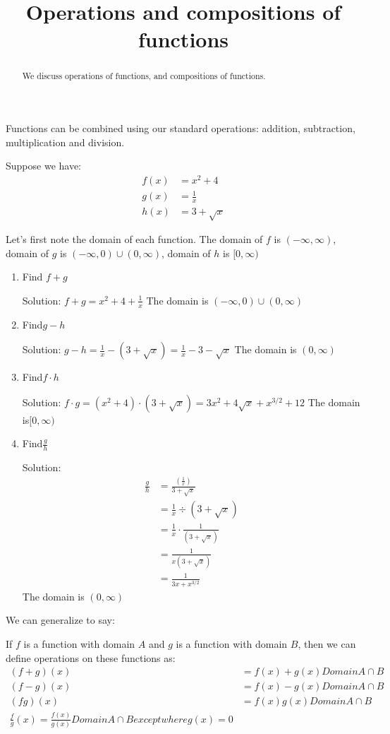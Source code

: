 \documentclass{ximera}
\title{Operations and compositions of functions}
\begin{document}
\begin{abstract}
  We discuss operations of functions, and compositions of functions.
\end{abstract}
\maketitle


Functions can be combined using our standard operations: addition, subtraction, multiplication and division.

\begin{example}
Suppose we have: 
\begin{align}
  f(x) &={{x}^{2}}+4 \\ 
  g(x) &=\frac{1}{x} \\ 
  h(x) &=3+\sqrt{x}  
\end{align}

Let's first note the domain of each function.  The domain of $f$ is
$(-\infty ,\infty )$, domain of $g$ is $(-\infty ,0)\cup (0,\infty )$,
domain of $h$ is $[0,\infty)$
\begin{enumerate}
\item Find $f+g$
  
  Solution: $f+g={{x}^{2}}+4+\frac{1}{x}$  The domain is $(-\infty ,0)\cup (0,\infty )$
\item Find$g-h$ 

  Solution: $g-h=\frac{1}{x}-(3+\sqrt{x})=\frac{1}{x}-3-\sqrt{x}$ The domain is $(0,\infty )$
\item Find$f\cdot h$
  
Solution: $f\cdot g=\left( {{x}^{2}}+4 \right)\cdot \left( 3+\sqrt{x} \right)=3{{x}^{2}}+4\sqrt{x}+{{x}^{3/2}}+12$ The domain is$[0,\infty )$
\item Find$\frac{g}{h}$ 

  Solution:
  \begin{align*}
    \frac{g}{h} &=\frac{\left( \frac{1}{x} \right)}{3+\sqrt{x}}\\
    &=\frac{1}{x}\div \left( 3+\sqrt{x} \right)\\
    &=\frac{1}{x}\cdot \frac{1}{\left( 3+\sqrt{x} \right)}\\
    &=\frac{1}{x\left( 3+\sqrt{x} \right)}\\
    &=\frac{1}{3x+{{x}^{3/2}}}
  \end{align*}
  The domain is $(0,\infty )$
\end{enumerate}
\end{example}

We can generalize to say:
\begin{definition}
If $f$ is a function with domain $A$ and $g$ is a function with domain $B$, then we can define operations on these functions as:
\begin{align*}
(f+g)(x) &=f(x)+g(x) Domain A \cap B\\
(f-g)(x) &=f(x)-g(x)  Domain A \cap B\\
(fg)(x) &=f(x)g(x)  Domain A \cap B\\
\frac{f}{g}(x) = \frac{f(x)}{g(x)} Domain A \cap B except where g(x)=0
\end{align*}
\end{definition}
\end{document}
